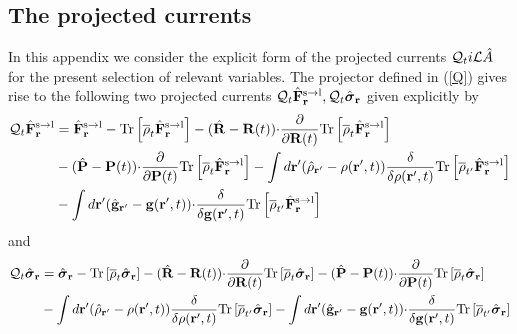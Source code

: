 \documentclass[b5paper,openright,10pt]{book}
\begin{document}
\begin{appendices}
\chapter{The projected currents}
\label{Ap:Projected}
In  this appendix  we  consider  the explicit  form  of the  projected
currents  ${\cal  Q}_ti{\cal L}\hat{A}$  for  the  present  selection  of  relevant
variables.   The projector  defined  in (\ref{Q})  gives  rise to  the
following  two projected  currents  ${\cal  Q}_t\hat{\bf F}^{\rm  s\to
  l}_{{\bf r}},  {\cal Q}_t\hat{\boldsymbol{\sigma}}_{{\bf  r}}$ given
explicitly by
\begin{align}
  {\cal Q}_t\hat{\bf F}^{\rm s\to l}_{{\bf r}}&=
\hat{\bf F}^{\rm s\to l}_{{\bf r}}- {\rm Tr}\left[\overline{\rho}_{t} \hat{\bf F}^{\rm s\to l}_{{\bf r}}\right]
-(\hat{\bf R}-{\bf R}(t)){\cdot}\frac{\partial}{\partial {\bf R}(t)}
{\rm Tr}\left[\overline{\rho}_{t} \hat{\bf F}^{\rm s\to l}_{{\bf r}}\right]
\nonumber \\
&-(\hat{\bf P}-{\bf P}(t)){\cdot}\frac{\partial}{\partial {\bf P}(t)}
{\rm Tr}\left[\overline{\rho}_{t} \hat{\bf F}^{\rm s\to l}_{{\bf r}}\right]
-\int d{\bf r}'(\hat{\rho}_{{\bf r}'}-\rho({\bf r}',t))
\frac{\delta}{\delta \rho({\bf r}',t)}{\rm Tr}\left[\overline{\rho}_{t'}  \hat{\bf F}^{\rm s\to l}_{{\bf r}}\right]
\nonumber\\
&-\int d{\bf r}'(\hat{\bf g}_{{\bf r}'}-{\bf g}({\bf r}',t))
{\cdot}\frac{\delta}{\delta {\bf g}({\bf r}',t)}{\rm Tr}\left[\overline{\rho}_{t'}  \hat{\bf F}^{\rm s\to l}_{{\bf r}}\right]
\label{QF0}
\end{align}
and 
\begin{align}
  {\cal Q}_t\hat{\boldsymbol{\sigma}}_{{\bf r}}&=
\hat{\boldsymbol{\sigma}}_{{\bf r}}- {\rm Tr}\left[\overline{\rho}_{t} \hat{\boldsymbol{\sigma}}_{{\bf r}}\right]
-(\hat{\bf R}-{\bf R}(t)){\cdot}\frac{\partial}{\partial {\bf R}(t)}
{\rm Tr}\left[\overline{\rho}_{t} \hat{\boldsymbol{\sigma}}_{{\bf r}}\right]
-(\hat{\bf P}-{\bf P}(t)){\cdot}\frac{\partial}{\partial {\bf P}(t)}
{\rm Tr}\left[\overline{\rho}_{t} \hat{\boldsymbol{\sigma}}_{{\bf r}}\right]
\nonumber\\
&-\int d{\bf r}'(\hat{\rho}_{{\bf r}'}-\rho({\bf r}',t))
\frac{\delta}{\delta \rho({\bf r}',t)}{\rm Tr}\left[\overline{\rho}_{t'}\hat{\boldsymbol{\sigma}}_{{\bf r}}\right]
-\int d{\bf r}'(\hat{\bf g}_{{\bf r}'}-{\bf g}({\bf r}',t))
{\cdot}\frac{\delta}{\delta {\bf g}({\bf r}',t)}{\rm Tr}\left[\overline{\rho}_{t'}  \hat{\boldsymbol{\sigma}}_{{\bf r}}\right]
\label{QS0}

\end{align}
\end{appendices}
\end{document}
